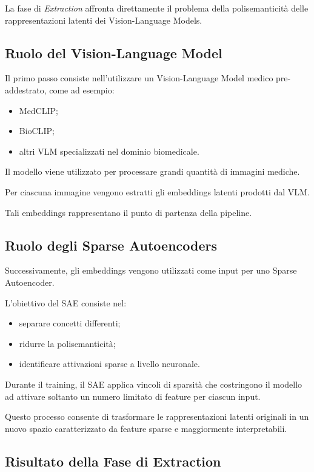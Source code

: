La fase di \textit{Extraction} affronta direttamente il problema della polisemanticità delle rappresentazioni latenti dei Vision-Language Models.

\subsection{Ruolo del Vision-Language Model}

Il primo passo consiste nell'utilizzare un Vision-Language Model medico pre-addestrato, come ad esempio:

\begin{itemize}
    \item MedCLIP;
    \item BioCLIP;
    \item altri VLM specializzati nel dominio biomedicale.
\end{itemize}

Il modello viene utilizzato per processare grandi quantità di immagini mediche.

Per ciascuna immagine vengono estratti gli embeddings latenti prodotti dal VLM.

Tali embeddings rappresentano il punto di partenza della pipeline.

\subsection{Ruolo degli Sparse Autoencoders}

Successivamente, gli embeddings vengono utilizzati come input per uno Sparse Autoencoder.

L'obiettivo del SAE consiste nel:

\begin{itemize}
    \item separare concetti differenti;
    \item ridurre la polisemanticità;
    \item identificare attivazioni sparse a livello neuronale.
\end{itemize}

Durante il training, il SAE applica vincoli di sparsità che costringono il modello ad attivare soltanto un numero limitato di feature per ciascun input.

Questo processo consente di trasformare le rappresentazioni latenti originali in un nuovo spazio caratterizzato da feature sparse e maggiormente interpretabili.

\subsection{Risultato della Fase di Extraction}

